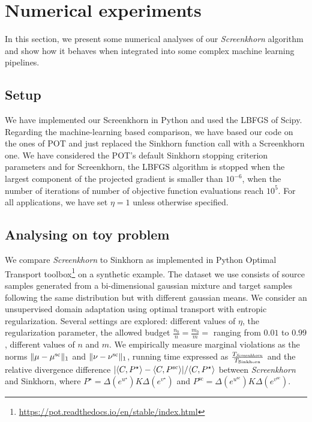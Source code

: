 
\section{Numerical experiments} %
\label{sec:numerical_experiments}

In this section, we present some numerical analyses of our
\emph{Screenkhorn} algorithm and show how it behaves when
integrated into some complex machine learning pipelines.

\subsection{Setup}

We have implemented our Screenkhorn in Python and used the LBFGS of
Scipy. Regarding the machine-learning based comparison, we have based our code
on the ones of POT \cite{flamary2017pot} and just replaced the Sinkhorn function call with a Screenkhorn one. We have considered the POT's default Sinkhorn stopping criterion parameters and for Screenkhorn, the LBFGS algorithm is stopped when the 
largest component of the projected gradient is smaller than $10^{-6}$, when the number of iterations of number of objective function evaluations reach $10^{5}$. For all applications, we have set $\eta=1$ unless otherwise specified.

\subsection{Analysing on toy problem}

We compare \emph{Screenkhorn} to Sinkhorn as implemented in Python Optimal Transport toolbox\footnote{\url{https://pot.readthedocs.io/en/stable/index.html}} on  a synthetic example. The dataset we use consists of source samples generated from a bi-dimensional gaussian mixture and target samples following the same distribution but with different gaussian means. We consider an unsupervised domain adaptation using optimal transport with entropic regularization.  Several settings are explored: different values of $\eta$, the regularization parameter, the allowed budget $\frac{n_b}{n} = \frac{m_b}{m} = $ ranging from $0.01$ to $0.99$, different values of $n$ and $m$.
 We empirically measure  marginal violations as the norms $\|{\mu} -{\mu}^{\text{sc}}\|_1$ and $\|{\nu} -{\nu}^{\text{sc}}\|_1$, running time expressed as $\frac{T_{\text{\emph{Screenkhorn}}}}{T_{\text{Sinkhorn}}}$ and the relative divergence difference $| \langle C, P^\star \rangle - \langle C, P^{\text{sc}} \rangle|/\langle C, P^\star \rangle$ between \emph{Screenkhorn} and Sinkhorn, where $P^\star = \Delta(e^{u^\star}) K \Delta(e^{v^\star})$ and $P^{\text{sc}} = \Delta(e^{u^{\text{sc}}}) K \Delta(e^{v^{\text{sc}}}).$

